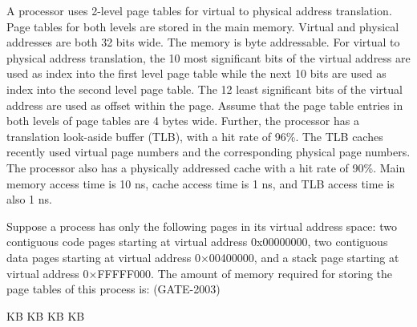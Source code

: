 
\begin{questyle}

  \question  A processor uses 2-level page tables for virtual to physical address translation. Page tables for
             both levels are stored in the main memory. Virtual and physical addresses are both 32 bits wide.
             The memory is byte addressable. For virtual to physical address translation, the 10 most significant
             bits of the virtual address are used as index into the first level page table while the next 10 bits
             are used as index into the second level page table. The 12 least significant bits of the virtual
             address are used as offset within the page. Assume that the page table entries in both levels of
             page tables are 4 bytes wide. Further, the processor has a translation look-aside buffer (TLB), with a
             hit rate of 96\%. The TLB caches recently used virtual page numbers and the corresponding physical
             page numbers. The processor also has a physically addressed cache with a hit rate of 90\%.
             Main memory access time is 10 ns, cache access time is 1 ns, and TLB access time is also 1 ns.

             Suppose a process has only the following pages in its virtual address space: two contiguous code
             pages starting at virtual address 0x00000000, two contiguous data pages starting at virtual
             address 0×00400000, and a stack page starting at virtual address 0×FFFFF000. The amount of memory
             required for storing the page tables of this process is: (GATE-2003)

            \begin{choices}
               KB
               KB
               KB
               KB
            \end{choices}

\end{questyle}


